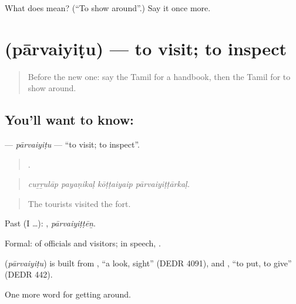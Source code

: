 \begin{tcolorbox}[breakable,colback=teal!4,colframe=teal!35!black,title={Before you move on}]
What does  mean? (\textquotedblleft{}To show around\textquotedblright{}.) Say it once more.
\end{tcolorbox}
\section[\texorpdfstring{\ta{பார்வையிடு} (pārvaiyiṭu)}{பார்வையிடு (pārvaiyiṭu)}]{ (pārvaiyiṭu) — to visit; to inspect}

\label{lesson:TA-C421-parvaiyitu}



\begin{quote}
Before the new one: say the Tamil for a handbook, then the Tamil for to show around.
\end{quote}

\subsection*{You'll want to know: }
\textbf{} — \emph{pārvaiyiṭu} — \textquotedblleft{}to visit; to inspect\textquotedblright{}.

\begin{quote}
   .
\end{quote}

\begin{quote}
\emph{cuṟṟulāp payaṇikaḷ kōṭṭaiyaip pārvaiyiṭṭārkaḷ.}
\end{quote}

\begin{quote}
The tourists visited the fort.
\end{quote}

Past (I …): , \emph{pārvaiyiṭṭēṉ}.

Formal: of officials and visitors; in speech,  .

\begin{cousinweb}
\textbf{} (\emph{pārvaiyiṭu}) is built from , \textquotedblleft{}a look, sight\textquotedblright{} (DEDR 4091), and , \textquotedblleft{}to put, to give\textquotedblright{} (DEDR 442).
\end{cousinweb}

\begin{grammarlens}[title={What you've built}]
One more word for getting around.
\end{grammarlens}

